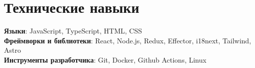 \documentclass[letterpaper,11pt]{article}
\begin{document}
\section{Технические навыки}
\begin{itemize}[leftmargin=0.15in, label={}]
  \small{\item{
                \textbf{Языки}{: JavaScript, TypeScript, HTML, CSS} \\
                \textbf{Фреймворки и библиотеки}{: React, Node.js, Redux, Effector, i18next, Tailwind, Astro } \\
                \textbf{Инструменты разработчика}{: Git, Docker, Github Actions, Linux} \\
          }}
\end{itemize}

\end{document}
